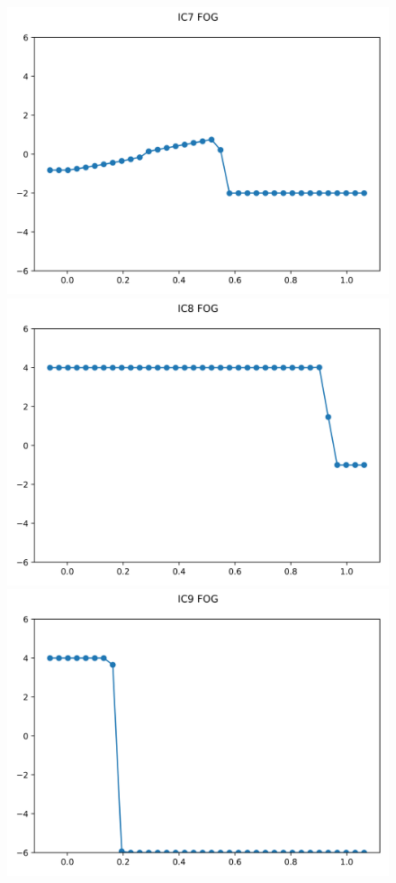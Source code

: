 \documentclass{article}
\begin{document}
\begin{figure}[t]
        \centering
        \includegraphics[width=.95\textwidth]{../../code/unsafe_IC7Methodfu_plot.png}
        \includegraphics[width=.95\textwidth]{../../code/unsafe_IC8Methodfu_plot.png}
        \includegraphics[width=.95\textwidth]{../../code/unsafe_IC9Methodfu_plot.png}

\end{figure}
\end{document}
